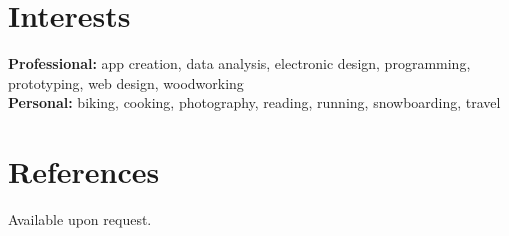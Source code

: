 \documentclass[hidelinks]{kkurucz-cv}
\begin{document}

\section{Interests}

\textbf{Professional:} app creation, data analysis, electronic design, programming, prototyping, web design, woodworking
\\
\textbf{Personal:}  biking, cooking, photography, reading, running, snowboarding, travel
\vspace{2mm}

\section{References}

{Available upon request.}
\end{document}

